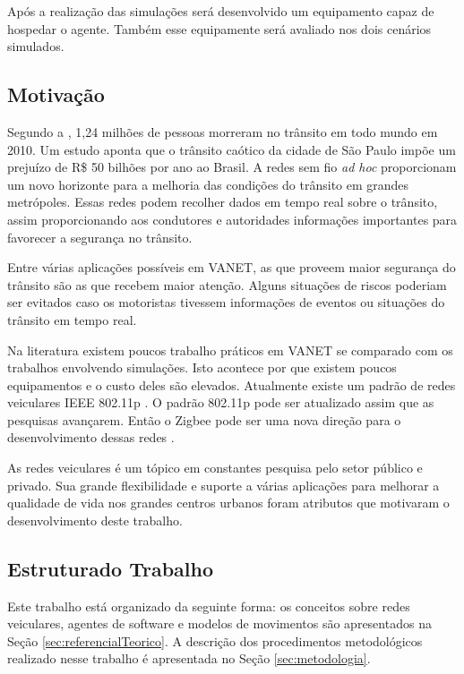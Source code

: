 Após a realização das simulações será desenvolvido um equipamento capaz de hospedar o agente. Também esse equipamente será avaliado nos dois cenários simulados.  

\subsection{Motivação}

Segundo a \cite{oms:2013}, 1,24 milhões de pessoas morreram no trânsito em todo mundo em 2010. Um estudo \cite{Cintra:2012} aponta que o trânsito caótico da cidade de São Paulo impõe um prejuízo de R\$ 50 bilhões por ano ao Brasil. A redes sem fio \emph{ad hoc} proporcionam um novo horizonte para a melhoria das condições do trânsito em grandes metrópoles. Essas redes podem recolher dados em tempo real sobre o trânsito, assim proporcionando aos condutores e autoridades informações importantes para favorecer a segurança no trânsito.  	

Entre várias aplicações possíveis em VANET, as que proveem maior segurança do trânsito são as que recebem maior atenção. Alguns situações de riscos poderiam ser evitados caso os motoristas tivessem informações de eventos ou situações do trânsito em tempo real.

Na literatura existem poucos trabalho práticos em VANET se comparado com os trabalhos envolvendo simulações. Isto acontece por que existem poucos equipamentos e o custo deles são elevados. Atualmente existe um padrão de redes veiculares IEEE 802.11p \cite{Jiang:2008}. O padrão 802.11p pode ser atualizado assim que as pesquisas avançarem. Então o Zigbee pode ser uma nova direção para o desenvolvimento dessas redes \cite{Bhargav:2013}. 

As redes veiculares é um tópico em constantes pesquisa pelo setor público e privado. Sua grande flexibilidade e suporte a várias aplicações para melhorar a qualidade de vida nos grandes centros urbanos foram atributos que motivaram o desenvolvimento deste trabalho.

\subsection{Estruturado Trabalho}

Este trabalho está organizado da seguinte forma: os conceitos sobre redes veiculares, agentes de software e modelos de movimentos são apresentados na Seção \ref{sec:referencialTeorico}. A descrição dos procedimentos metodológicos realizado nesse trabalho é apresentada no Seção \ref{sec:metodologia}.
